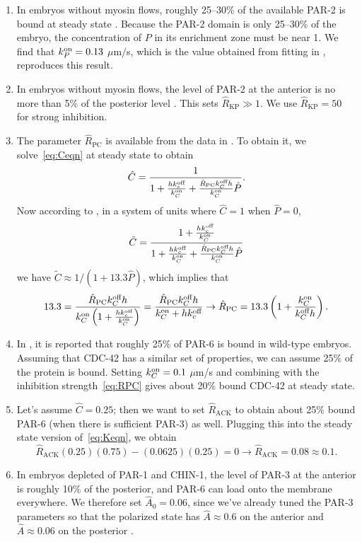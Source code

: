 \documentclass[11pt]{article}
\newcommand{\6}[1]{#1_{\text{6}}}
\newcommand{\3}[1]{#1_{\text{3}}}
\begin{document}
\begin{enumerate}
\item In embryos without myosin flows, roughly 25--30\% of the available PAR-2 is bound at steady state \cite[Fig.~S3]{gross2019guiding}. Because the PAR-2 domain is only 25--30\% of the embryo, the concentration of $P$ in its enrichment zone must be near 1. We find that $k^\text{on}_P=0.13$ $\mu$m/s, which is the value obtained from fitting in \cite{gross2019guiding}, reproduces this result.
\item In embryos without myosin flows, the level of PAR-2 at the anterior is no more than 5\% of the posterior level \cite[Fig.~2c]{gross2019guiding}. This sets $\hat R_\text{KP} \gg 1$. We use $\hat R_\text{KP}=50$ for strong inhibition. 
\item The parameter $\hat{R}_\text{PC}$ is available from the data in \cite{sailer2015dynamic}. To obtain it, we solve\ \eqref{eq:Ceqn} at steady state to obtain
\begin{equation}
\hat C = \frac{1}{1+\frac{h k^\text{off}_c}{k^\text{on}_C}+\frac{\hat R_\text{PC}k^\text{off}_C h}{k^\text{on}_C} \hat P}. 
\end{equation}
Now according to \cite{sailer2015dynamic}, in a system of units where $\hat C=1$ when $\hat P=0$,
\begin{equation*}
\tilde C =   \frac{1+\frac{h k^\text{off}_c}{k^\text{on}_C}}{1+\frac{h k^\text{off}_c}{k^\text{on}_C}+\frac{\hat R_\text{PC}k^\text{off}_C h}{k^\text{on}_C} \hat P}
\end{equation*} 
we have $\tilde{C} \approx 1/(1+13.3\hat{P})$, which implies that 
\begin{equation}
\label{eq:RPC}
13.3 = \frac{\hat R_\text{PC}k^\text{off}_C h}{k^\text{on}_C\left(1+\frac{h k^\text{off}_c}{k^\text{on}_C}\right)}= \frac{\hat R_\text{PC}k^\text{off}_C h}{k^\text{on}_C+h k^\text{off}_c} \rightarrow \hat R_\text{PC}=13.3\left(1+\frac{k^\text{on}_C}{k^\text{off}_C h}\right).
\end{equation}
\item In \cite[Fig.~S3i]{gross2019guiding}, it is reported that roughly 25\% of PAR-6 is bound in wild-type embryos. Assuming that CDC-42 has a similar set of properties, we can assume 25\% of the protein is bound. Setting $k^\text{on}_C=0.1$ $\mu$m/s and combining with the inhibition strength\ \eqref{eq:RPC} gives about 20\% bound CDC-42 at steady state.
\item Let's assume $\hat C = 0.25$; then we want to set $\hat{R}_\text{ACK}$ to obtain about 25\% bound PAR-6 (when there is sufficient PAR-3) as well. Plugging this into the steady state version of\ \eqref{eq:Keqn}, we obtain
\begin{equation*}
\hat{R}_\text{ACK}(0.25)(0.75)- (0.0625)(0.25)=0 \rightarrow \hat{R}_\text{ACK}=0.08\approx 0.1.
\end{equation*}
\item In embryos depleted of PAR-1 and CHIN-1, the level of PAR-3 at the anterior is roughly 10\% of the posterior, and PAR-6 can load onto the membrane everywhere. We therefore set $\hat A_0=0.06$, since we've already tuned the PAR-3 parameters so that the polarized state has $\hat A \approx 0.6$ on the anterior and $\hat A \approx 0.06$ on the posterior \cite{lang2023oligomerization}.
\end{enumerate}
\end{document}
